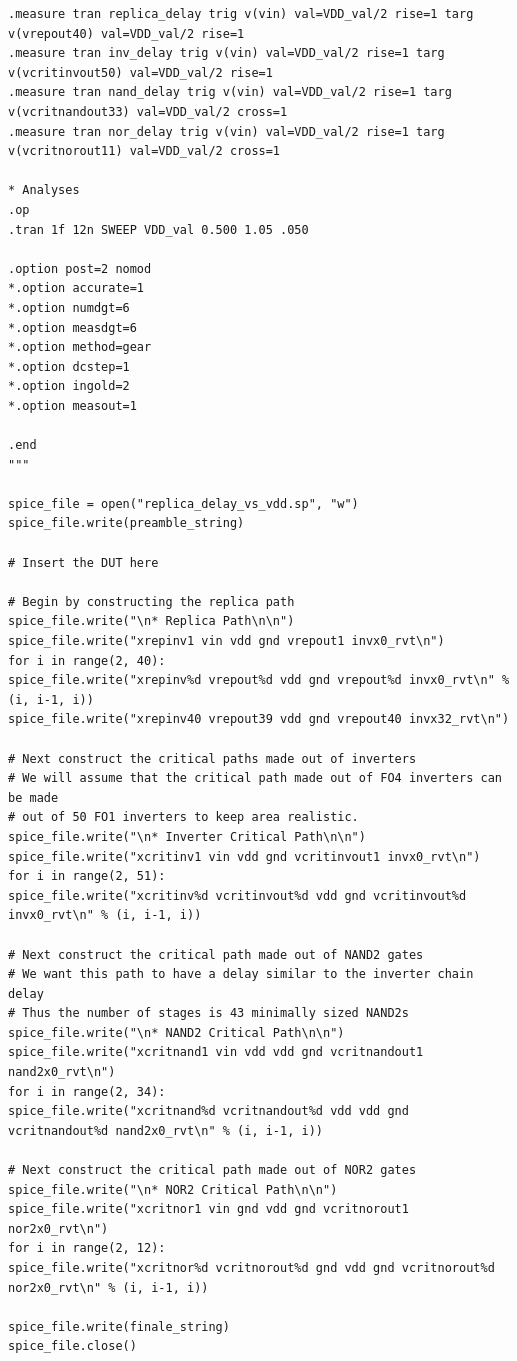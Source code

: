 \documentclass[11pt]{article}
\begin{document}
\begin{verbatim}
.measure tran replica_delay trig v(vin) val=VDD_val/2 rise=1 targ v(vrepout40) val=VDD_val/2 rise=1
.measure tran inv_delay trig v(vin) val=VDD_val/2 rise=1 targ v(vcritinvout50) val=VDD_val/2 rise=1
.measure tran nand_delay trig v(vin) val=VDD_val/2 rise=1 targ v(vcritnandout33) val=VDD_val/2 cross=1
.measure tran nor_delay trig v(vin) val=VDD_val/2 rise=1 targ v(vcritnorout11) val=VDD_val/2 cross=1

* Analyses
.op
.tran 1f 12n SWEEP VDD_val 0.500 1.05 .050

.option post=2 nomod
*.option accurate=1
*.option numdgt=6
*.option measdgt=6
*.option method=gear
*.option dcstep=1
*.option ingold=2
*.option measout=1

.end
"""

spice_file = open("replica_delay_vs_vdd.sp", "w")
spice_file.write(preamble_string)

# Insert the DUT here

# Begin by constructing the replica path
spice_file.write("\n* Replica Path\n\n")
spice_file.write("xrepinv1 vin vdd gnd vrepout1 invx0_rvt\n")
for i in range(2, 40):
spice_file.write("xrepinv%d vrepout%d vdd gnd vrepout%d invx0_rvt\n" % (i, i-1, i))
spice_file.write("xrepinv40 vrepout39 vdd gnd vrepout40 invx32_rvt\n")

# Next construct the critical paths made out of inverters
# We will assume that the critical path made out of FO4 inverters can be made 
# out of 50 FO1 inverters to keep area realistic.
spice_file.write("\n* Inverter Critical Path\n\n")
spice_file.write("xcritinv1 vin vdd gnd vcritinvout1 invx0_rvt\n")
for i in range(2, 51):
spice_file.write("xcritinv%d vcritinvout%d vdd gnd vcritinvout%d invx0_rvt\n" % (i, i-1, i))

# Next construct the critical path made out of NAND2 gates
# We want this path to have a delay similar to the inverter chain delay
# Thus the number of stages is 43 minimally sized NAND2s
spice_file.write("\n* NAND2 Critical Path\n\n")
spice_file.write("xcritnand1 vin vdd vdd gnd vcritnandout1 nand2x0_rvt\n")
for i in range(2, 34):
spice_file.write("xcritnand%d vcritnandout%d vdd vdd gnd vcritnandout%d nand2x0_rvt\n" % (i, i-1, i))

# Next construct the critical path made out of NOR2 gates
spice_file.write("\n* NOR2 Critical Path\n\n")
spice_file.write("xcritnor1 vin gnd vdd gnd vcritnorout1 nor2x0_rvt\n")
for i in range(2, 12):
spice_file.write("xcritnor%d vcritnorout%d gnd vdd gnd vcritnorout%d nor2x0_rvt\n" % (i, i-1, i))

spice_file.write(finale_string)
spice_file.close()
\end{verbatim}
\end{document}
